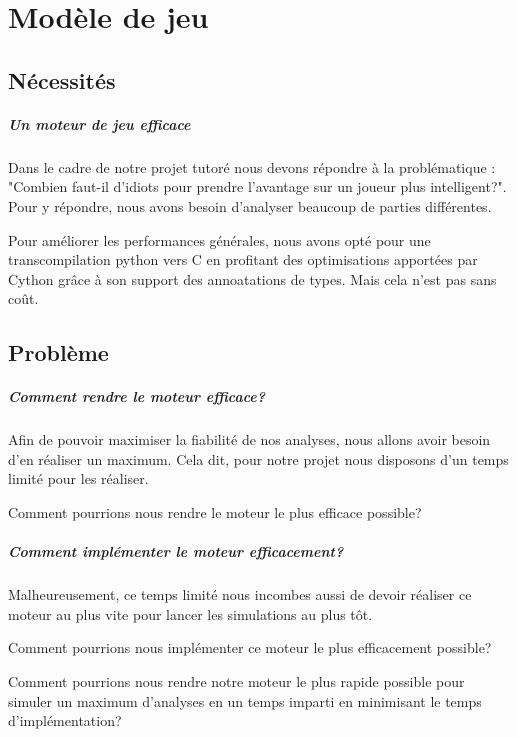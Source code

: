 \chapter{Modèle de jeu}

	\section{Nécessités}
	
		\paragraph{Un moteur de jeu efficace}
		Dans le cadre de notre projet tutoré nous devons répondre à la problématique : "Combien faut-il d'idiots pour prendre l'avantage sur un joueur plus intelligent?".
		Pour y répondre, nous avons besoin d'analyser beaucoup de parties différentes. 
		
		Pour améliorer les performances générales, nous avons opté pour une transcompilation python vers C en profitant des optimisations apportées par Cython grâce à son support des annoatations de types. 
		Mais cela n'est pas sans coût.
		
	\section{Problème}
	
		\paragraph{Comment rendre le moteur efficace?}
		Afin de pouvoir maximiser la fiabilité de nos analyses, nous allons avoir besoin d'en réaliser un maximum.
		Cela dit, pour notre projet nous disposons d'un temps limité pour les réaliser.
		
		Comment pourrions nous rendre le moteur le plus efficace possible?
		
		
		\paragraph{Comment implémenter le moteur efficacement?}
		Malheureusement, ce temps limité nous incombes aussi de devoir réaliser ce moteur au plus vite pour lancer les simulations au plus tôt.
		
		Comment pourrions nous implémenter ce moteur le plus efficacement possible?
		
		
		\begin{problem}
		Comment pourrions nous rendre notre moteur le plus rapide possible pour simuler un maximum d'analyses en un temps imparti en minimisant le temps d'implémentation?
		\end{problem}

